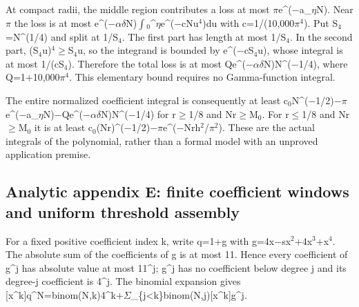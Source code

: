 \documentclass[11pt,a4paper]{article}
\begin{document}
At compact radii, the middle region contributes a loss at most \ensuremath{\pi}e\textasciicircum{}(\ensuremath{-}a\_\ensuremath{\eta}N). Near \ensuremath{\pi} the loss is at most e\textasciicircum{}(\ensuremath{-}\ensuremath{\alpha}\ensuremath{\delta}N)\ensuremath{\int}\ensuremath{_0}\textasciicircum{}\ensuremath{\eta}e\textasciicircum{}(\ensuremath{-}cNu\ensuremath{^4})du with c=1/(10,000\ensuremath{\pi}\ensuremath{^4}). Put S\ensuremath{_4}=N\textasciicircum{}(1/4) and split at 1/S\ensuremath{_4}. The first part has length at most 1/S\ensuremath{_4}. In the second part, (S\ensuremath{_4}u)\ensuremath{^4}\ensuremath{\geq}S\ensuremath{_4}u, so the integrand is bounded by e\textasciicircum{}(\ensuremath{-}cS\ensuremath{_4}u), whose integral is at most 1/(cS\ensuremath{_4}). Therefore the total loss is at most Qe\textasciicircum{}(\ensuremath{-}\ensuremath{\alpha}\ensuremath{\delta}N)N\textasciicircum{}(\ensuremath{-}1/4), where Q=1+10,000\ensuremath{\pi}\ensuremath{^4}. This elementary bound requires no Gamma-function integral.

The entire normalized coefficient integral is consequently at least c\ensuremath{_0}N\textasciicircum{}(\ensuremath{-}1/2)\ensuremath{-}\ensuremath{\pi}e\textasciicircum{}(\ensuremath{-}a\_\ensuremath{\eta}N)\ensuremath{-}Qe\textasciicircum{}(\ensuremath{-}\ensuremath{\alpha}\ensuremath{\delta}N)N\textasciicircum{}(\ensuremath{-}1/4) for r\ensuremath{\geq}1/8 and Nr\ensuremath{\geq}M\ensuremath{_0}. For r\ensuremath{\leq}1/8 and Nr\ensuremath{\geq}M\ensuremath{_0} it is at least c\ensuremath{_0}(Nr)\textasciicircum{}(\ensuremath{-}1/2)\ensuremath{-}\ensuremath{\pi}e\textasciicircum{}(\ensuremath{-}Nrh\ensuremath{^2}/\ensuremath{\pi}\ensuremath{^2}). These are the actual integrals of the polynomial, rather than a formal model with an unproved application premise.

\subsection{Analytic appendix E: finite coefficient windows and uniform threshold assembly}
For a fixed positive coefficient index k, write q=1+g with g=4x\ensuremath{-}sx\ensuremath{^2}+4x\ensuremath{^3}+x\ensuremath{^4}. The absolute sum of the coefficients of g is at most 11. Hence every coefficient of g\textasciicircum{}j has absolute value at most 11\textasciicircum{}j; g\textasciicircum{}j has no coefficient below degree j and its degree-j coefficient is 4\textasciicircum{}j. The binomial expansion gives [x\textasciicircum{}k]q\textasciicircum{}N=binom(N,k)4\textasciicircum{}k+\ensuremath{\Sigma}\_\{j<k\}binom(N,j)[x\textasciicircum{}k]g\textasciicircum{}j.
\end{document}
